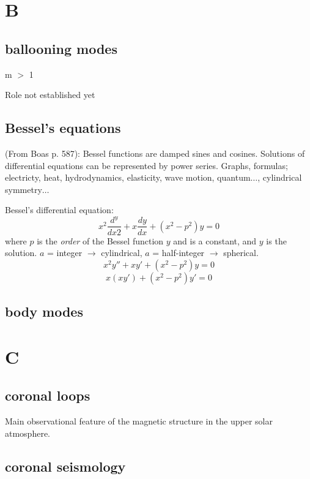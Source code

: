 \documentclass[12pt]{article}
\begin{document}
\section*{B}

\subsection*{ballooning modes}
\begin{itemize*}
    \item m $>$ 1

    \item Role not established yet
\end{itemize*}

\subsection*{Bessel's equations}

(From Boas p. 587): Bessel functions are damped sines and cosines.
Solutions of differential equations can be represented by power series.
Graphs, formulas; electricty, heat, hydrodynamics, elasticity, wave motion,
quantum$\ldots$, cylindrical symmetry$\ldots$

Bessel's differential equation:
$$ x^2\frac{d^y}{dx2} + x\frac{dy}{dx} + (x^2-p^2)y = 0 $$
where $p$ is the \emph{order} of the Bessel function $y$ and is a constant, and
$y$ is the solution.
$a$ = integer $\rightarrow$ cylindrical,
$a$ = half-integer $\rightarrow$ spherical.
$$ x^2y'' + xy' + (x^2-p^2)y = 0  $$
$$ x(xy') + (x^2-p^2)y' = 0  $$

\subsection*{body modes}

\section*{C}

\subsection*{coronal loops}
\begin{itemize*}
    \item Main observational feature of the magnetic structure in the
        upper solar atmosphere.
\end{itemize*}

\subsection*{coronal seismology}
\end{document}
